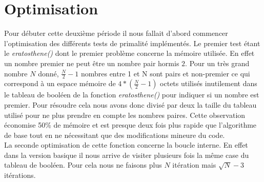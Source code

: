 		
	\section{Optimisation}
	Pour débuter cette deuxième période il nous fallait d'abord commencer l'optimisation des différents tests de primalité implémentés. Le premier test étant le \textit{eratosthene()} dont le premier problème concerne la mémoire utilisée. En effet un nombre premier ne peut être un nombre pair hormis $2$. Pour un très grand nombre $N$ donné, $\frac{N}{2}-1$ nombres entre 1 et N sont pairs et non-premier ce qui correspond à un espace mémoire de $4*(\frac{N}{2}-1)$ octets utilisés inutilement dans le tableau de booléen de la fonction \textit{eratosthene()} pour indiquer si un nombre est premier. Pour résoudre cela nous avons donc divisé par deux la taille du tableau utilisé pour ne plus prendre en compte les nombres paires. Cette observation économise 50\% de mémoire et est presque deux fois plus rapide que l'algorithme de base tout en ne nécessitant que des modifications mineure du code.\\
La seconde optimisation de cette fonction concerne la boucle interne. En effet dans la version basique il nous arrive de visiter plusieurs fois la même case du tableau de booléen. Pour cela nous ne faisons plus $N$ itération mais $\sqrt{N}-3$ itérations.

